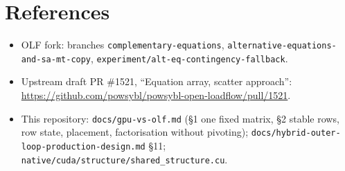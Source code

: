 \documentclass[11pt,a4paper]{article}
\newcommand{\code}[1]{\texttt{\small #1}}
\begin{document}
\section*{References}
\begin{itemize}
\item OLF fork: branches \code{complementary-equations},
      \code{alternative-equations-and-sa-mt-copy},
      \code{experiment/alt-eq-contingency-fallback}.
\item Upstream draft PR \#1521, ``Equation array, scatter approach'':
      \url{https://github.com/powsybl/powsybl-open-loadflow/pull/1521}.
\item This repository: \code{docs/gpu-vs-olf.md} (\S1 one fixed matrix, \S2 stable rows,
      row state, placement, factorisation without pivoting);
      \code{docs/hybrid-outer-loop-production-design.md} \S11;
      \code{native/cuda/structure/shared\_structure.cu}.
\end{itemize}
\end{document}

